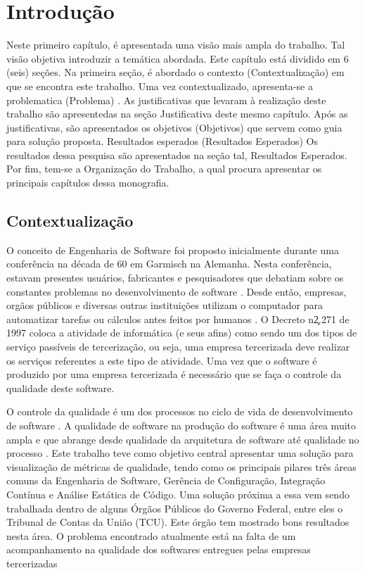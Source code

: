 \chapter[Introdução]{Introdução}
	Neste primeiro capítulo, é apresentada uma visão mais ampla do trabalho. Tal visão objetiva introduzir a temática abordada. Este capítulo está dividido em 6 (seis) seções. Na primeira seção, é abordado o contexto (Contextualização) em que se encontra este trabalho. Uma vez contextualizado, apresenta-se a problematica (Problema) . As justificativas que levaram à realização deste trabalho são apresentedas na seção Justificativa deste mesmo capítulo. Após as justificativas, são apresentados os objetivos (Objetivos) que servem como guia para solução proposta. Resultados esperados (Resultados Esperados) Os resultados dessa pesquisa  são apresentados na seção tal, Resultados Esperados. Por fim, tem-se a Organização do Trabalho, a qual procura apresentar os principais capítulos dessa monografia.


\section{Contextualização}
	O conceito de Engenharia de Software foi proposto inicialmente durante uma conferência na década de 60 em Garmisch na Alemanha. Nesta conferência, estavam presentes usuários, fabricantes e pesquisadores que debatiam sobre os constantes problemas no desenvolvimento de software \cite{Paduelli}. Desde então, empresas, orgãos públicos e diversas outras instituições utilizam o computador para automatizar tarefas ou cálculos antes feitos por humanos \cite{fonseca2007historia}. O Decreto n\c 2.271 de 1997 \cite{decreto_2271} coloca a atividade de informática (e seus afins) como sendo um dos tipos de serviço passíveis de tercerização, ou seja, uma empresa tercerizada deve realizar os serviços referentes a este tipo de atividade. Uma vez que o software é produzido por uma empresa tercerizada é necessário que se faça o controle da qualidade deste software.

O controle da qualidade é um dos processos no ciclo de vida de desenvolvimento de software \cite{machado_metricas_2004}. A qualidade de software na produção do software é uma área muito ampla e que abrange desde qualidade da arquitetura de software até qualidade no processo . Este trabalho teve como objetivo central apresentar uma solução para visualização de métricas de qualidade, tendo como os principais pilares três áreas comuns da Engenharia de Software, Gerência de Configuração, Integração Contínua e Análise Estática de Código. Uma solução próxima a essa vem sendo trabalhada dentro de alguns Órgãos Públicos do Governo Federal, entre eles o Tribunal de Contas da União (TCU). Este órgão tem mostrado bons resultados nesta área. O problema encontrado atualmente está na falta de um acompanhamento na qualidade dos softwares entregues pelas empresas tercerizadas 	

